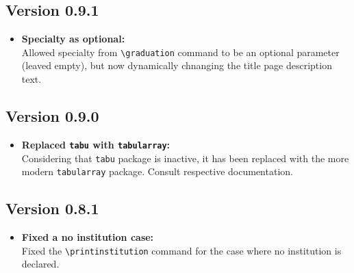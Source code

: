 \subsection{Version 0.9.1}
\begin{itemize}
\item \textbf{Specialty as optional:}\\
Allowed specialty from \verb|\graduation| command to be an optional parameter (leaved empty), but now dynamically chnanging the title page description text.
\end{itemize}

\subsection{Version 0.9.0}
\begin{itemize}
\item \textbf{Replaced \texttt{tabu} with \texttt{tabularray}:}\\
Considering that \texttt{tabu} package is inactive, it has been replaced with the more modern \texttt{tabularray} package. Consult respective documentation.
\end{itemize}

\subsection{Version 0.8.1}
\begin{itemize}
\item \textbf{Fixed a no institution case:}\\
Fixed the \verb|\printinstitution| command for the case where no institution is declared.
\end{itemize}

